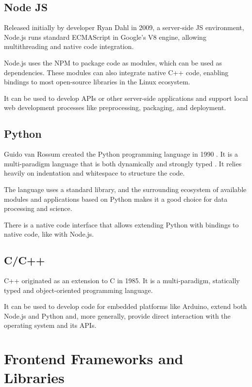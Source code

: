 \subsection{Node JS}

Released initially by developer Ryan Dahl in 2009, a server-side \ac{JS} environment, Node.js runs standard ECMAScript in Google's V8 engine, allowing multithreading and native code integration.

Node.js uses the \ac{NPM} to package code as modules, which can be used as dependencies. These modules can also integrate native C++ code, enabling bindings to most open-source libraries in the Linux ecosystem.

It can be used to develop \ac{API}s or other server-side applications and support local web development processes like preprocessing, packaging, and deployment. 

\subsection{Python}

Guido van Rossum created the Python programming language in 1990 \parencite{pythonHistory}. It is a multi-paradigm language that is both dynamically and strongly typed \parencite{pythonTyping}. It relies heavily on indentation and whitespace to structure the code.

The language uses a standard library, and the surrounding ecosystem of available modules and applications based on Python makes it a good choice for data processing and science.

There is a native code interface that allows extending Python with bindings to native code, like with Node.js.

\subsection{C/C++}

C++ originated as an extension to C in 1985. It is a multi-paradigm, statically typed and object-oriented programming language.

It can be used to develop code for embedded platforms like Arduino, extend both Node.js and Python and, more generally, provide direct interaction with the operating system and its APIs.


\section{Frontend Frameworks and Libraries}

